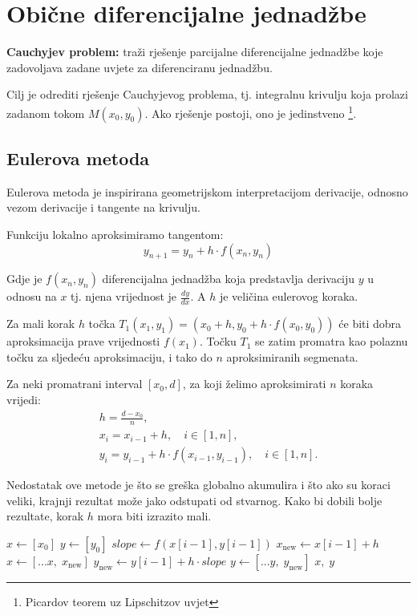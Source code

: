 \section{Obične diferencijalne jednadžbe}

\textbf{Cauchyjev problem:} traži rješenje parcijalne diferencijalne jednadžbe
koje zadovoljava zadane uvjete za diferenciranu jednadžbu.

Cilj je odrediti rješenje Cauchyjevog problema, tj. integralnu krivulju koja
prolazi zadanom tokom $M(x_0,y_0)$. Ako rješenje postoji, ono je jedinstveno
\footnote{Picardov teorem uz Lipschitzov uvjet}.

\subsection{Eulerova metoda}

Eulerova metoda je inspirirana geometrijskom interpretacijom derivacije, odnosno
vezom derivacije i tangente na krivulju.

Funkciju lokalno aproksimiramo tangentom:
$$
y_{n+1} = y_n + h\cdot f(x_n, y_n)
$$

Gdje je $f(x_n, y_n)$ diferencijalna jednadžba koja predstavlja derivaciju $y$ u
odnosu na $x$ tj. njena vrijednost je $\frac{dy}{dx}$. A $h$ je veličina
eulerovog koraka.

Za mali korak $h$ točka $T_1(x_1, y_1) = (x_0 + h, y_0 + h \cdot f(x_0, y_0))$
će biti dobra aproksimacija prave vrijednosti $f(x_1)$. Točku $T_1$ se zatim
promatra kao polaznu točku za sljedeću aproksimaciju, i tako do $n$
aproksimiranih segmenata.

Za neki promatrani interval $[x_0, d]$, za koji želimo aproksimirati $n$ koraka
vrijedi:
\begin{gather*}
    h=\frac{d - x_0}{n},\\
    x_i = x_{i-1} + h,\quad i \in [1, n],\\
    y_i = y_{i-1} + h\cdot f(x_{i-1}, y_{i-1}),\quad i \in [1, n].
\end{gather*}

Nedostatak ove metode je što se greška globalno akumulira i što ako su koraci
veliki, krajnji rezultat može jako odstupati od stvarnog. Kako bi dobili bolje
rezultate, korak $h$ mora biti izrazito mali.

\smallskip

\begin{algorithmic}
    \State $x \gets [x_0]$
    \State $y \gets [y_0]$
        \State $slope \gets f(x[i-1], y[i-1])$
        \State $x_{\text{new}} \gets x[i-1] + h$
        \State $x \gets [...x,\;x_{\text{new}}]$
        \State $y_{\text{new}} \gets y[i-1] + h \cdot slope$
        \State $y \gets [...y,\;y_{\text{new}}]$
    \EndFor
    \State \Return $x,\;y$
\EndFunction
\end{algorithmic}

